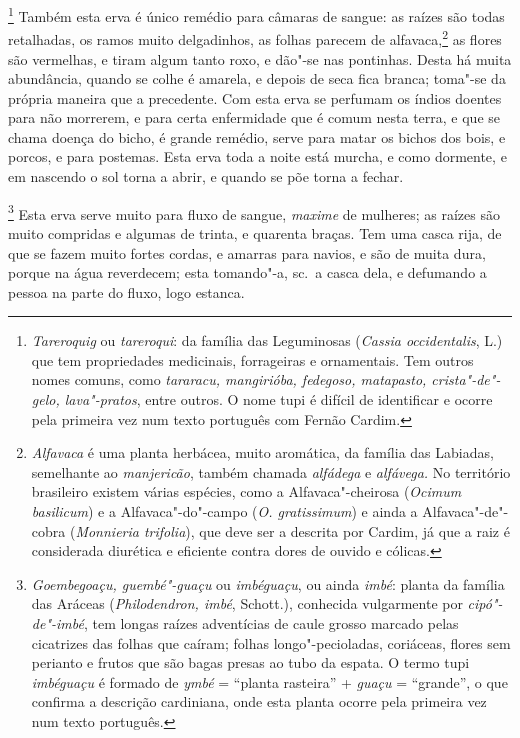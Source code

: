 \footnote{ \textit{Tareroquig} ou \textit{tareroqui}: 
da família das Leguminosas (\textit{Cassia occidentalis}, L.) que
tem propriedades medicinais, forrageiras e ornamentais. Tem outros
nomes comuns, como \textit{tararacu, mangirióba, fedegoso, matapasto,
crista"-de"-gelo, lava"-pratos}, entre outros. O nome tupi é difícil de
identificar e ocorre pela primeira vez num texto português com Fernão
Cardim.} Também esta erva é único remédio para câmaras de
sangue: as raízes são todas retalhadas, os ramos muito delgadinhos, as
folhas parecem de alfavaca,\footnote{ \textit{Alfavaca} é uma
planta herbácea, muito aromática, da família das Labiadas, semelhante
ao \textit{manjericão}, também chamada \textit{alfádega} e 
\textit{alfávega.} No território brasileiro existem várias
espécies, como a Alfavaca"-cheirosa (\textit{Ocimum basilicum}) 
e a Alfavaca"-do"-campo (\textit{O. gratissimum}) e ainda a
Alfavaca"-de"-cobra (\textit{Monnieria trifolia}), que deve ser a
descrita por Cardim, já que a raiz é considerada diurética e eficiente
contra dores de ouvido e cólicas.} as flores são vermelhas, e tiram
algum tanto roxo, e dão"-se nas pontinhas. Desta há muita abundância,
quando se colhe é amarela, e depois de seca fica branca; toma"-se da
própria maneira que a precedente. Com esta erva se perfumam os índios
doentes para não morrerem, e para certa enfermidade que é comum nesta
terra, e que se chama doença do bicho, é grande remédio, serve para
matar os bichos dos bois, e porcos, e para postemas. Esta erva toda a
noite está murcha, e como dormente, e em nascendo o sol torna a abrir,
e quando se põe torna a fechar.

\footnote{ \textit{Goembegoaçu, guembé"-guaçu} ou
\textit{imbéguaçu}, ou ainda \textit{imbé}: planta da família das
Aráceas (\textit{Philodendron, imbé}, Schott.), conhecida
vulgarmente por \textit{cipó"-de"-imbé}, tem longas raízes adventícias de
caule grosso marcado pelas cicatrizes das folhas que caíram; folhas
longo"-pecioladas, coriáceas, flores sem perianto e frutos que são bagas
presas ao tubo da espata. O termo tupi \textit{imbéguaçu} é formado de
\textit{ymbé} = ``planta rasteira'' + \textit{guaçu} = ``grande'', o que
confirma a descrição cardiniana, onde esta planta ocorre pela primeira
vez num texto português.} Esta erva serve muito para fluxo
de sangue, \textit{maxime} de mulheres; as raízes são muito compridas e algumas
de trinta, e quarenta braças. Tem uma casca rija, de que se fazem muito
fortes cordas, e amarras para navios, e são de muita dura, porque na
água reverdecem; esta tomando"-a, sc.~a casca dela, e defumando a pessoa
na parte do fluxo, logo estanca.

